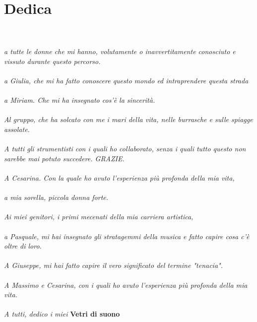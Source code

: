 
\chapter*{Dedica}


\textit{
\\
\\
a tutte le donne che mi hanno, volutamente o inavvertitamente conosciuto e vissuto durante questo percorso. \\
\\
a Giulia, che mi ha fatto conoscere questo mondo ed intraprendere questa strada \\
\\
a Miriam. Che mi ha insegnato cos'è la sincerità. \\
\\
Al gruppo, che ha solcato con me i mari della vita, nelle burrasche e sulle spiagge assolate. \\
\\
A tutti gli strumentisti con i quali ho collaborato, senza i quali tutto questo non sarebbe mai potuto succedere. GRAZIE. \\
\\
A Cesarina. Con la quale ho avuto l'esperienza più profonda della mia vita, \\
\\
a mia sorella, piccola donna forte. \\
\\
Ai miei genitori, i primi mecenati della mia carriera artistica, \\
\\
a Pasquale, mi hai insegnato gli stratagemmi della musica e fatto capire cosa c'è oltre di loro. \\
\\
A Giuseppe, mi hai fatto capire il vero significato del termine "tenacia". \\
\\
A Massimo e Cesarina, con i quali ho avuto l'esperienza più profonda della mia vita. \\
\\
A tutti, dedico i miei} \textbf{Vetri di suono} \\
\\
